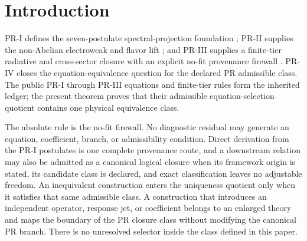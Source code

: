 \documentclass[11pt]{article}
\begin{document}
\begin{abstract}
Abstract second-jet families and the gauge-invariant operator $|\Phi^\dagger D_\mu\Phi|^2$ lie outside the PR admissible class because they introduce independent response data or a new Wilson coefficient.  They are therefore different theories, not additional PR parameters or alternative PR solutions.  The complete PR class used here is fixed by the public PR-I through PR-III ledger together with inheritance, minimality, covariance, completeness, nonredundancy, canonical normalization, declared finite-tier order, and the no-fit firewall.  On every equation-selection coordinate of that class, exact normal-form defects have one zero.  We show that the dependency-ordered admissible equation quotient is the singleton $\{[\mathrm{PR}]\}$: every working in-class presentation is equivalent, and every inequivalent proposal violates at least one declared guideline.  No discrete or continuous free selector remains.  This is a closure theorem for the PR equation architecture; distinct physical states of one fixed field equation are not distinct theories and are not counted as alternative equation architectures.
\end{abstract}

\section{Introduction}

PR-I defines the seven-postulate spectral-projection foundation \cite{PRI}; PR-II supplies the non-Abelian electroweak and flavor lift \cite{PRII}; and PR-III supplies a finite-tier radiative and cross-sector closure with an explicit no-fit provenance firewall \cite{PRIII}.  PR-IV closes the equation-equivalence question for the declared PR admissible class.  The public PR-I through PR-III equations and finite-tier rules form the inherited ledger; the present theorem proves that their admissible equation-selection quotient contains one physical equivalence class.

The absolute rule is the no-fit firewall.  No diagnostic residual may generate
an equation, coefficient, branch, or admissibility condition.  Direct derivation from the PR-I postulates is one complete provenance route, and a downstream relation may also be admitted as a canonical logical closure when its framework origin is stated, its candidate class is declared, and exact classification leaves no adjustable freedom.  An inequivalent construction enters the uniqueness quotient only when it satisfies that same admissible class.  A construction that introduces an independent operator, response jet, or coefficient belongs to an enlarged theory and maps the boundary of the PR closure class without modifying the canonical PR branch. There is no unresolved selector inside the class defined in this paper.
\end{document}
